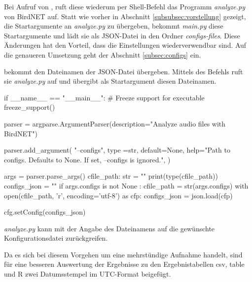 Bei Aufruf von , ruft diese wiederum per Shell-Befehl das Programm \textit{analyze.py} von BirdNET auf.
Statt wie vorher in Abschnitt \ref{subsubsec:vorstellung} gezeigt, die Startargumente an \textit{analyze.py} zu übergeben, bekommt \textit{main.py} diese Startargumente und lädt sie als JSON-Datei in den Ordner \textit{configs-files}.
Diese Änderungen hat den Vorteil, dass die Einstellungen wiederverwendbar sind. Auf die genaueren Umsetzung geht der Abschnitt \ref{subsec:configs} ein.



 bekommt den Dateinamen der JSON-Datei übergeben. Mittels des Befehls  ruft sie \textit{analyze.py} auf und übergibt als Startargument diesen Dateinamen. 

\begin{python}

if __name__ == "__main__":
    # Freeze support for executable
    freeze_support()
    
    parser = argparse.ArgumentParser(description="Analyze audio files with BirdNET")
    
    parser.add_argument(
        "--configs",
        type =str,
        default=None,
        help="Path to configs. Defaults to None. If set, --configs is ignored.",
    )

    args = parser.parse_args()
    cfile_path: str = ""
    print(type(cfile_path))
    configs_json = ""
    if args.configs is not None :
        cfile_path = str(args.configs)
        with open(cfile_path, 'r', encoding='utf-8') as cfp:
            configs_json = json.load(cfp)

        cfg.setConfig(configs_json)
    \end{python}

\textit{analyze.py} kann mit der Angabe des Dateinamens auf die gewünschte Konfigurationsdatei zurückgreifen. 



Da es sich bei diesem Vorgehen um eine mehrstündige Aufnahme handelt, sind für eine besseren Auswertung der Ergebnisse %
zu den Ergebnistabellen csv, table und R zwei Datumsstempel im UTC-Format beigefügt. 




